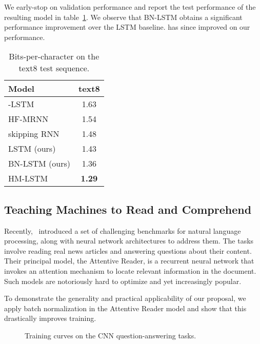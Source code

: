 \documentclass{article} \pdfoutput=1 \usepackage[utf8]{inputenc}
\begin{document}
We early-stop on validation performance and report the test performance of the
resulting model in table~\ref{tab:text8_test}.  We observe that BN-LSTM obtains
a significant performance improvement over the LSTM baseline.
\citet{chung2016hierarchical} has since improved on our performance.

\begin{table}[!hb]
  \center
  \begin{tabular}{@{}lc@{}}
  \toprule
  \bf Model & \bf text8 \\
  \midrule
  -LSTM~\citep{zhang2016architectural} & 1.63 \\
  HF-MRNN~\citep{mikolov2012subword} & 1.54 \\
  skipping RNN~\citep{pachitariu2013regularization} & 1.48 \\
  \midrule
  LSTM (ours) &  1.43 \\
  BN-LSTM (ours) & 1.36 \\
  \midrule
  HM-LSTM~\citep{chung2016hierarchical} & \textbf{1.29} \\
  \bottomrule
\end{tabular}
\caption{Bits-per-character on the text8 test sequence.}
\label{tab:text8_test}
\end{table}

\subsection{Teaching Machines to Read and Comprehend}
\label{sec:less-attr}

Recently,~\citet{attentivereader} introduced a set of challenging benchmarks
for natural language processing, along with neural network architectures to
address them.  The tasks involve reading real news articles and answering
questions about their content.  Their principal model, the Attentive Reader, is
a recurrent neural network that invokes an attention mechanism to locate
relevant information in the document.  Such models are notoriously hard to
optimize and yet increasingly popular.


To demonstrate the generality and practical applicability of our proposal,
we apply batch normalization in the Attentive Reader model
and show that this drastically improves training.

\begin{figure}[!ht]
  \center {}\hspace{2mm}
  \caption{Training curves on the CNN question-answering tasks.}
  \label{fig:attr2}
\end{figure}
\end{document}
